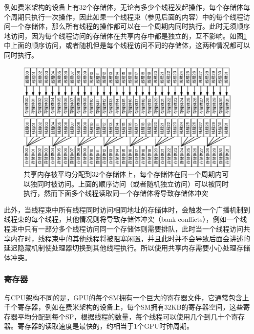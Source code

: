 例如费米架构的设备上有32个存储体，无论有多少个线程发起操作，每个存储体每个周期只执行一次操作，因此如果一个线程束（参见后面的内容）中的每个线程访问一个存储体，那么所有线程的操作都可以在一个周期内同时执行。此时无须顺序地访问，因为每个线程访问的存储体在共享内存中都是独立的，互不影响。如图\ref{f:rp-shared-memory}中上面的顺序访问，或者随机但是每个线程访问不同的存储体，这两种情况都可以同时执行。

\begin{figure}
\begin{fullwidth}
	\includegraphics[width=\thewidth]{figures/rp/shared-memory}
	\caption{共享内存被平均分配到32个存储体上，每个存储体在同一个周期内可以独同时被访问。上面的顺序访问（或者随机独立访问）可以被同时执行，然而下面多个线程读取同一个存储体将导致存储体冲突}
	\label{f:rp-shared-memory}
\end{fullwidth}
\end{figure}

此外，当线程束中所有线程同时访问相同地址的存储体时，会触发一个广播机制到线程束的每个线程，其他情况则将导致存储体冲突（bank conflicts），例如一个线程束中只有一部分多个线程访问同一个存储体则需要排队，此时当一个线程访问共享内存时，线程束中的其他线程将被阻塞闲置，并且此时并不会导致后面会讲述的延迟隐藏机制使处理器切换到其他线程执行。所以使用共享内存需要小心处理存储体冲突。





\subsubsection{寄存器}
与CPU架构不同的是，GPU的每个SM拥有一个巨大的寄存器文件，它通常包含上千个寄存器，例如在费米架构的设备上，每个SM拥有32KB的寄存器空间，这些寄存器平均分配到每个SP，根据线程的数量，每个线程可以使用几个到几十个寄存器。寄存器的读取速度是最快的，约相当于1个GPU时钟周期。

